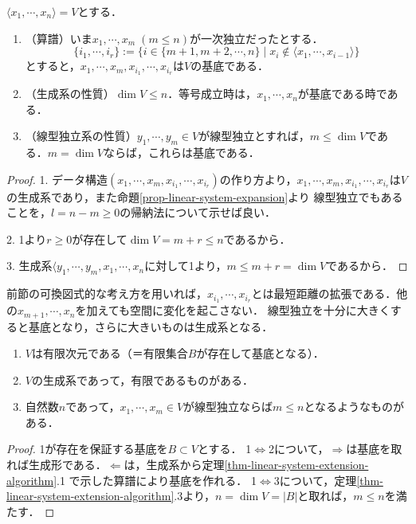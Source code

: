 \documentclass[uplatex, dvipdfmx]{jsreport}
\begin{document}
\begin{theorem}[線型独立系の基底への延長算譜]\label{thm-linear-system-extension-algorithm}
    $\langle x_1,\cdots,x_n\rangle =V$とする．
    \begin{enumerate}
        \item （算譜）いま$x_1,\cdots,x_m\;(m\le n)$が一次独立だったとする．
        \[\{i_1,\cdots,i_r\}:=\{i\in \{m+1,m+2,\cdots,n\}\mid x_i\notin\langle x_1,\cdots,x_{i-1}\rangle\}\]
        とすると，$x_1,\cdots,x_m,x_{i_1},\cdots,x_{i_r}$は$V$の基底である．
        \item （生成系の性質）$\dim V\le n$．等号成立時は，$x_1,\cdots,x_n$が基底である時である．
        \item （線型独立系の性質）$y_1,\cdots,y_m\in V$が線型独立とすれば，$m\le\dim V$である．$m=\dim V$ならば，これらは基底である．
    \end{enumerate}
\end{theorem}
\begin{proof}
    1. データ構造$(x_1,\cdots,x_m,x_{i_1},\cdots,x_{i_r})$の作り方より，$x_1,\cdots,x_m,x_{i_1},\cdots,x_{i_r}$は$V$の生成系であり，また命題\ref{prop-linear-system-expansion}より
    線型独立でもあることを，$l=n-m\ge 0$の帰納法について示せば良い．

    2. 1より$r\ge 0$が存在して$\dim V=m+r\le n$であるから．

    3. 生成系$\langle y_1,\cdots,y_m,x_1,\cdots,x_n$に対して1より，$m\le m+r=\dim V$であるから．
\end{proof}
\begin{remark}
    前節の可換図式的な考え方を用いれば，$x_{i_1},\cdots,x_{i_r}$とは最短距離の拡張である．他の$x_{m+1},\cdots,x_n$を加えても空間に変化を起こさない．
    線型独立を十分に大きくすると基底となり，さらに大きいものは生成系となる．
\end{remark}

\begin{corollary}[有限次元であることの特徴付け]\mbox{}
    \begin{enumerate}
        \item $V$は有限次元である（＝有限集合$B$が存在して基底となる）．
        \item $V$の生成系であって，有限であるものがある．
        \item 自然数$n$であって，$x_1,\cdots,x_m\in V$が線型独立ならば$m\le n$となるようなものがある．
    \end{enumerate}
\end{corollary}
\begin{proof}
    1が存在を保証する基底を$B\subset V$とする．
    1$\Leftrightarrow$2について，$\Rightarrow$は基底を取れば生成形である．$\Leftarrow$は，生成系から定理\ref{thm-linear-system-extension-algorithm}.1
    で示した算譜により基底を作れる．
    1$\Leftrightarrow$3について，定理\ref{thm-linear-system-extension-algorithm}.3より，$n=\dim V=|B|$と取れば，$m\le n$を満たす．
\end{proof}
\end{document}
